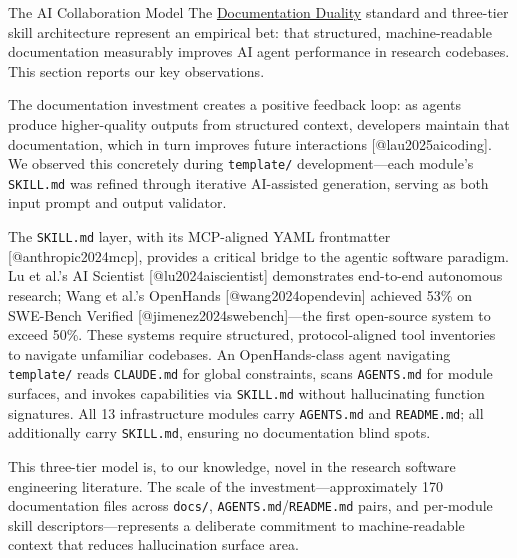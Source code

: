 \documentclass[
  ignorenonframetext,
]{beamer}
\author{\texorpdfstring{}{}}
\date{}
\begin{document}
\begin{frame}[fragile]{The AI Collaboration Model}
\protect{}\label{the-ai-collaboration-model}
The
\href{03c_documentation.md\#documentation-duality-and-ai-collaboration}{Documentation
Duality} standard and three-tier skill architecture represent an
empirical bet: that structured, machine-readable documentation
measurably improves AI agent performance in research codebases. This
section reports our key observations.

The documentation investment creates a positive feedback loop: as agents
produce higher-quality outputs from structured context, developers
maintain that documentation, which in turn improves future interactions
{[}@lau2025aicoding{]}. We observed this concretely during
\texttt{template/} development---each module's \texttt{SKILL.md} was
refined through iterative AI-assisted generation, serving as both input
prompt and output validator.

The \texttt{SKILL.md} layer, with its MCP-aligned YAML frontmatter
{[}@anthropic2024mcp{]}, provides a critical bridge to the agentic
software paradigm. Lu et al.'s AI Scientist {[}@lu2024aiscientist{]}
demonstrates end-to-end autonomous research; Wang et al.'s OpenHands
{[}@wang2024opendevin{]} achieved 53\% on SWE-Bench Verified
{[}@jimenez2024swebench{]}---the first open-source system to exceed
50\%. These systems require structured, protocol-aligned tool
inventories to navigate unfamiliar codebases. An OpenHands-class agent
navigating \texttt{template/} reads \texttt{CLAUDE.md} for global
constraints, scans \texttt{AGENTS.md} for module surfaces, and invokes
capabilities via \texttt{SKILL.md} without hallucinating function
signatures. All 13 infrastructure modules carry \texttt{AGENTS.md} and
\texttt{README.md}; all additionally carry \texttt{SKILL.md}, ensuring
no documentation blind spots.

This three-tier model is, to our knowledge, novel in the research
software engineering literature. The scale of the
investment---approximately 170 documentation files across
\texttt{docs/}, \texttt{AGENTS.md}/\texttt{README.md} pairs, and
per-module skill descriptors---represents a deliberate commitment to
machine-readable context that reduces hallucination surface area.
\end{frame}
\end{document}
